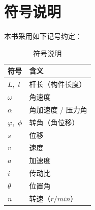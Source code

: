 \section{符号说明}
\label{sec:符号说明}

本书采用如下记号约定：

\begin{table}[H]
\centering
\caption{符号说明}
\label{tab:符号说明}
\begin{tabular}{ll}
\toprule
符号 & 含义 \\
\midrule
$L$,\, $l$ & 杆长（构件长度） \\
$\omega$ & 角速度 \\
$\alpha$ & 角加速度 / 压力角 \\
$\varphi$,\, $\phi$ & 转角（角位移） \\
$s$ & 位移 \\
$v$ & 速度 \\
$a$ & 加速度 \\
$i$ & 传动比 \\
$\theta$ & 位置角 \\
$n$ & 转速（$r/min$） \\
\bottomrule
\end{tabular}
\end{table}
